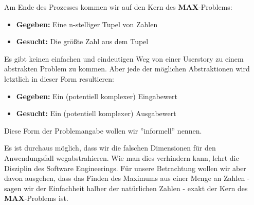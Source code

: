 Am Ende des Prozesses kommen wir auf den Kern des \textbf{MAX}-Problems:
\begin{itemize}
    \item \textbf{Gegeben:} Eine n-stelliger Tupel von Zahlen
    \item \textbf{Gesucht:} Die größte Zahl aus dem Tupel 
\end{itemize}

Es gibt keinen einfachen und eindeutigen Weg von einer Userstory
zu einem abstrakten Problem zu kommen.
Aber jede der möglichen Abstraktionen wird letztlich in dieser Form resultieren:
\begin{itemize}
    \item \textbf{Gegeben:} Ein (potentiell komplexer) Eingabewert
    \item \textbf{Gesucht:} Ein (potentiell komplexer) Ausgabewert
\end{itemize}
Diese Form der Problemangabe wollen wir ''informell'' nennen.

Es ist durchaus möglich,
dass wir die falschen Dimensionen für den Anwendungsfall wegabstrahieren.
Wie man dies verhindern kann, lehrt die Disziplin des Software Engineerings.
Für unsere Betrachtung wollen wir aber davon ausgehen,
dass das Finden des Maximums aus einer Menge an Zahlen
- sagen wir der Einfachheit halber der natürlichen Zahlen -
exakt der Kern des \textbf{MAX}-Problems ist.

